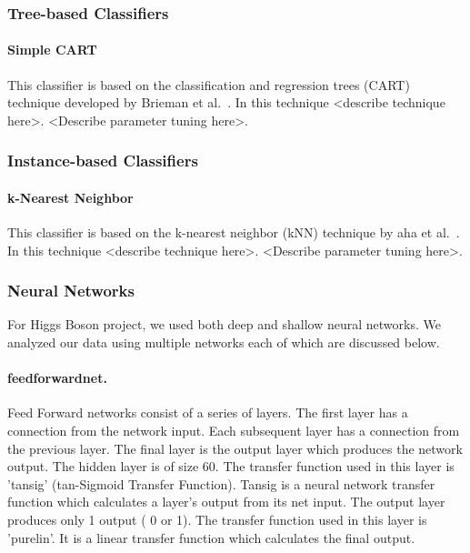 \subsubsection{Tree-based Classifiers}

\paragraph{Simple CART}

This classifier is based on the classification and regression trees (CART) technique developed by Brieman et al.~\cite{CART}. In this technique <describe technique here>. <Describe parameter tuning here>.

\subsubsection{Instance-based Classifiers}

\paragraph{k-Nearest Neighbor}

This classifier is based on the k-nearest neighbor (kNN) technique by aha et al.~\cite{kNN}. In this technique <describe technique here>. <Describe parameter tuning here>.


\subsubsection{Neural Networks}

For Higgs Boson project, we used both deep and shallow neural networks. We analyzed our data using multiple networks each of which are discussed below. 


\paragraph{feedforwardnet.} Feed Forward networks consist of a series of layers. The first layer has a connection from the network input. Each subsequent layer has a connection from the previous layer. The final layer is the output layer which produces the network output. 
The hidden layer is of size 60. The transfer function used in this layer is 'tansig' (tan-Sigmoid Transfer Function). Tansig is a neural network transfer function which calculates a layer's output from its net input. The output layer produces only 1 output ( 0 or 1). The transfer function used in this layer is 'purelin'. It is a linear transfer function which calculates the final output.


